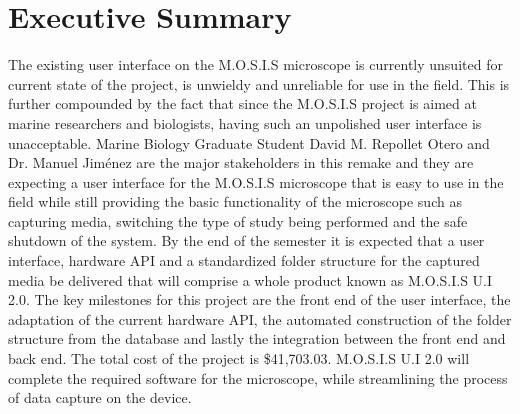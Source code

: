  \section*{Executive Summary}
 The existing user interface on the M.O.S.I.S microscope is currently unsuited for current state of the project, is unwieldy and unreliable for use in the field. This is further compounded by the fact that since the M.O.S.I.S project is aimed at marine researchers and biologists, having such an unpolished user interface is unacceptable. Marine Biology Graduate Student David M. Repollet Otero and Dr. Manuel Jiménez are the major stakeholders in this remake and they are expecting a user interface for the M.O.S.I.S microscope that is easy to use in the field while still providing the basic functionality of the microscope such as capturing media, switching the type of study being performed and the safe shutdown of the system. By the end of the semester it is expected that a user interface, hardware API and a standardized folder structure for the captured media be delivered that will comprise a whole product known as M.O.S.I.S U.I  2.0. The key milestones for this project are the front end of the user interface, the adaptation of the current hardware API, the automated construction of the folder structure from the database and lastly the integration between the front end and back end. The total cost of the project is \$41,703.03. M.O.S.I.S U.I 2.0 will complete the required software for the microscope, while streamlining the process of data capture on the device.
